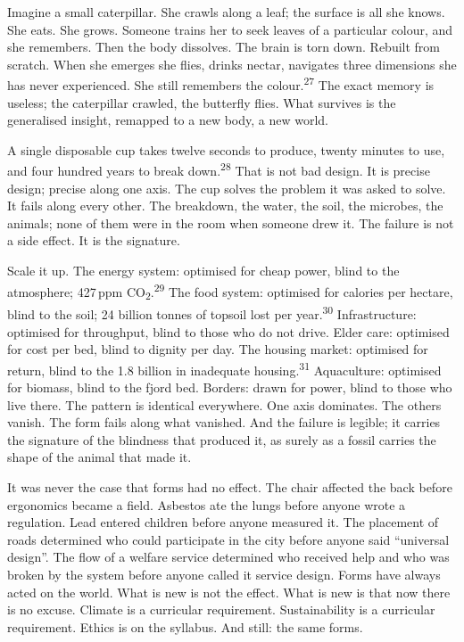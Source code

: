 \begin{widebody}
{\small

Imagine a small caterpillar. She crawls along a leaf; the surface is all she knows. She eats. She grows. Someone trains her to seek leaves of a particular colour, and she remembers. Then the body dissolves. The brain is torn down. Rebuilt from scratch. When she emerges she flies, drinks nectar, navigates three dimensions she has never experienced. She still remembers the colour.\textsuperscript{27} The exact memory is useless; the caterpillar crawled, the butterfly flies. What survives is the generalised insight, remapped to a new body, a new world.

A single disposable cup takes twelve seconds to produce, twenty minutes to use, and four hundred years to break down.\textsuperscript{28} That is not bad design. It is precise design; precise along one axis. The cup solves the problem it was asked to solve. It fails along every other. The breakdown, the water, the soil, the microbes, the animals; none of them were in the room when someone drew it. The failure is not a side effect. It is the signature.

Scale it up. The energy system: optimised for cheap power, blind to the atmosphere; 427\,ppm CO\textsubscript{2}.\textsuperscript{29} The food system: optimised for calories per hectare, blind to the soil; 24 billion tonnes of topsoil lost per year.\textsuperscript{30} Infrastructure: optimised for throughput, blind to those who do not drive. Elder care: optimised for cost per bed, blind to dignity per day. The housing market: optimised for return, blind to the 1.8 billion in inadequate housing.\textsuperscript{31} Aquaculture: optimised for biomass, blind to the fjord bed. Borders: drawn for power, blind to those who live there. The pattern is identical everywhere. One axis dominates. The others vanish. The form fails along what vanished. And the failure is legible; it carries the signature of the blindness that produced it, as surely as a fossil carries the shape of the animal that made it.

It was never the case that forms had no effect. The chair affected the back before ergonomics became a field. Asbestos ate the lungs before anyone wrote a regulation. Lead entered children before anyone measured it. The placement of roads determined who could participate in the city before anyone said ``universal design''. The flow of a welfare service determined who received help and who was broken by the system before anyone called it service design. Forms have always acted on the world. What is new is not the effect. What is new is that now there is no excuse. Climate is a curricular requirement. Sustainability is a curricular requirement. Ethics is on the syllabus. And still: the same forms.

}
\end{widebody}
